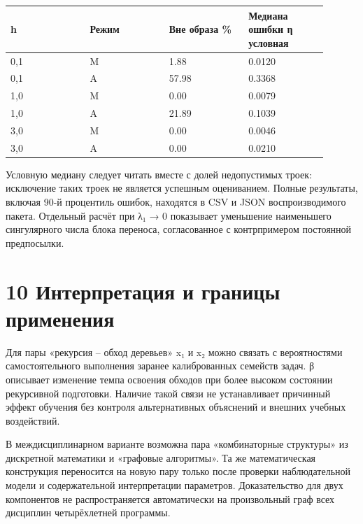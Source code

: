 \documentclass[11pt,a4paper]{article}
\begin{document}
\begin{longtable}{|p{0.225\linewidth}|p{0.225\linewidth}|p{0.225\linewidth}|p{0.225\linewidth}|}\hline

h & Режим & Вне образа \% & Медиана ошибки η условная\\\hline\endhead

0,1 & M & 1.88 & 0.0120\\\hline

0,1 & A & 57.98 & 0.3368\\\hline

1,0 & M & 0.00 & 0.0079\\\hline

1,0 & A & 21.89 & 0.1039\\\hline

3,0 & M & 0.00 & 0.0046\\\hline

3,0 & A & 0.00 & 0.0210\\\hline

\end{longtable}

Условную медиану следует читать вместе с долей недопустимых троек: исключение таких троек не является успешным оцениванием. Полные результаты, включая 90-й процентиль ошибок, находятся в CSV и JSON воспроизводимого пакета. Отдельный расчёт при λ₁ → 0 показывает уменьшение наименьшего сингулярного числа блока переноса, согласованное с контрпримером постоянной предпосылки.\par

\section*{10 Интерпретация и границы применения}

Для пары «рекурсия – обход деревьев» x₁ и x₂ можно связать с вероятностями самостоятельного выполнения заранее калиброванных семейств задач. β описывает изменение темпа освоения обходов при более высоком состоянии рекурсивной подготовки. Наличие такой связи не устанавливает причинный эффект обучения без контроля альтернативных объяснений и внешних учебных воздействий.\par

В междисциплинарном варианте возможна пара «комбинаторные структуры» из дискретной математики и «графовые алгоритмы». Та же математическая конструкция переносится на новую пару только после проверки наблюдательной модели и содержательной интерпретации параметров. Доказательство для двух компонентов не распространяется автоматически на произвольный граф всех дисциплин четырёхлетней программы.\par
\end{document}
